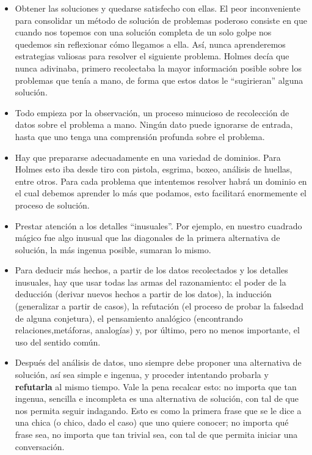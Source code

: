 \begin{itemize}
	\item Obtener las soluciones y quedarse satisfecho con ellas. El peor 
	inconveniente para consolidar un método de solución de problemas 
	poderoso consiste en que cuando nos topemos con una solución completa de 
	un solo golpe nos quedemos sin reflexionar cómo llegamos a ella. Así, nunca
	aprenderemos estrategias valiosas para resolver el siguiente problema. 
	Holmes decía que nunca adivinaba, primero
	recolectaba la mayor información posible sobre los problemas
	que tenía a mano, de forma que estos datos le ``sugirieran'' alguna
	solución.
	
	\item Todo empieza por la observación, un proceso minucioso de recolección
	de datos sobre el problema a mano. Ningún dato puede ignorarse de entrada,
	hasta que uno tenga una comprensión profunda sobre el problema.
	
	\item Hay que prepararse adecuadamente en una variedad de dominios. Para 
	Holmes esto iba desde tiro con pistola, esgrima, boxeo, análisis de 
	huellas, entre otros.
	Para cada problema que intentemos resolver habrá un dominio en el cual 
	debemos aprender lo más que podamos, esto facilitará enormemente el proceso 
	de solución.
	
	\item Prestar atención a los detalles ``inusuales''. Por ejemplo, en 
	nuestro cuadrado  mágico fue algo inusual que las diagonales de la primera 
	alternativa de solución, la más ingenua posible, sumaran lo mismo. 
	
	\item Para  deducir más hechos, a partir de los datos recolectados y los 
	detalles inusuales, hay que usar todas las armas del razonamiento: el poder 
	de la deducción (derivar nuevos hechos a partir de los datos), la inducción 
	(generalizar a partir de casos), la refutación (el proceso de probar la 
	falsedad de alguna conjetura), el pensamiento analógico (encontrando 
	relaciones,metáforas, analogías) y, por último, pero no menos importante, 
	el uso del sentido común.
	
	\item Después del análisis de datos, uno siempre debe proponer una 
	alternativa de solución, así sea simple e ingenua, y proceder intentando 
	probarla y {\bf refutarla} al mismo tiempo. Vale la pena recalcar esto: no 
	importa que tan ingenua, sencilla e incompleta es una alternativa de 
	solución, con tal de que nos permita seguir	indagando. Esto es como la 
	primera frase que se le dice a una chica (o chico, dado el caso) que uno 
	quiere conocer; no importa qué frase sea, no importa que tan trivial sea, 
	con tal de que permita iniciar una conversación.
	

\end{itemize}
